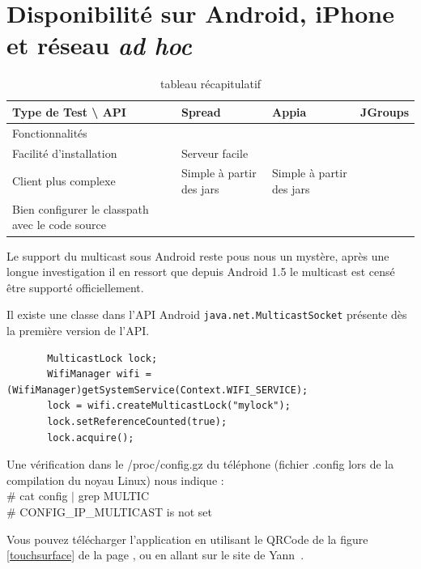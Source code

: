 \documentclass[a4paper,10pt]{report}
\begin{document}
\section{Disponibilité sur Android, iPhone et réseau \emph{ad hoc}}

\begin{table}[!hbp]
  \begin{centering}
    \begin{tabular}{|>{\centering}m{4cm}|>{\centering}m{4cm}|>{\centering}m{4cm}|>{\centering}m{4cm}|}
      \hline 
      Type de Test \textbackslash{} API & Spread & Appia & JGroups\tabularnewline
      \hline
      \hline 
      Fonctionnalités & \multicolumn{3}{c|}{API de communication}\tabularnewline
      \hline 
      Facilité d'installation & Serveur facile \\ Client plus complexe & Simple à partir des jars & Simple à partir des jars \\ Bien configurer le classpath avec le code source\tabularnewline
      \hline
    \end{tabular}
  \par\end{centering}
\caption{\label{tab_recap}tableau récapitulatif}
\end{table}


Le support du multicast sous Android reste pous nous un mystère, après une longue investigation il en ressort que depuis Android 1.5 le multicast est censé être supporté officiellement.
\lstset{language=java} 

Il existe une classe dans l'API Android \lstinline{java.net.MulticastSocket} présente dès la première version de l'API.

\lstset{commentstyle=\textit} 
\begin{lstlisting}
       MulticastLock lock;
       WifiManager wifi = (WifiManager)getSystemService(Context.WIFI_SERVICE);
       lock = wifi.createMulticastLock("mylock");
       lock.setReferenceCounted(true);
       lock.acquire();
\end{lstlisting} 

Une vérification dans le /proc/config.gz du téléphone (fichier .config lors de la compilation du noyau Linux) nous indique : \\
\# cat config $|$ grep MULTIC\\
\# CONFIG\_IP\_MULTICAST is not set

Vous pouvez télécharger l'application en utilisant le QRCode de la figure \ref{touchsurface} de la page \pageref{touchsurface}, ou en allant sur le site de Yann~\cite{site_yann}.
\end{document}
